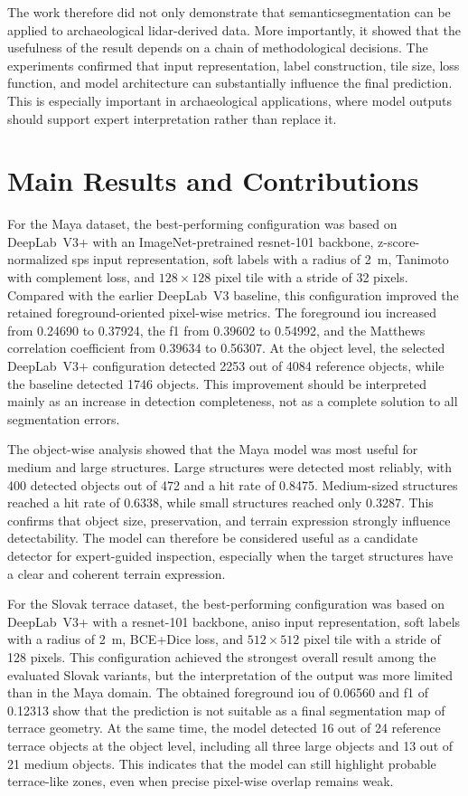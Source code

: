 The work therefore did not only demonstrate that \gls{semanticsegmentation} can be applied to archaeological \gls{lidar}-derived data. More importantly, it showed that the usefulness of the result depends on a chain of methodological decisions. The experiments confirmed that input representation, label construction, tile size, loss function, and model architecture can substantially influence the final prediction. This is especially important in archaeological applications, where model outputs should support expert interpretation rather than replace it.

\section{Main Results and Contributions}

For the Maya dataset, the best-performing configuration was based on DeepLab~V3+ with an ImageNet-pretrained \gls{resnet}-101 backbone, z-score-normalized \gls{sps} input representation, soft labels with a radius of 2~m, Tanimoto with complement loss, and $128 \times 128$ pixel tile with a stride of 32 pixels. Compared with the earlier DeepLab~V3 baseline, this configuration improved the retained foreground-oriented pixel-wise metrics. The foreground \gls{iou} increased from 0.24690 to 0.37924, the \gls{f1} from 0.39602 to 0.54992, and the Matthews correlation coefficient from 0.39634 to 0.56307. At the object level, the selected DeepLab~V3+ configuration detected 2253 out of 4084 reference objects, while the baseline detected 1746 objects. This improvement should be interpreted mainly as an increase in detection completeness, not as a complete solution to all segmentation errors.

The object-wise analysis showed that the Maya model was most useful for medium and large structures. Large structures were detected most reliably, with 400 detected objects out of 472 and a hit rate of 0.8475. Medium-sized structures reached a hit rate of 0.6338, while small structures reached only 0.3287. This confirms that object size, preservation, and terrain expression strongly influence detectability. The model can therefore be considered useful as a candidate detector for expert-guided inspection, especially when the target structures have a clear and coherent terrain expression.

For the Slovak terrace dataset, the best-performing configuration was based on DeepLab~V3+ with a \gls{resnet}-101 backbone, \gls{aniso} input representation, soft labels with a radius of 2~m, BCE+Dice loss, and $512 \times 512$ pixel tile with a stride of 128 pixels. This configuration achieved the strongest overall result among the evaluated Slovak variants, but the interpretation of the output was more limited than in the Maya domain. The obtained foreground \gls{iou} of 0.06560 and \gls{f1} of 0.12313 show that the prediction is not suitable as a final segmentation map of terrace geometry. At the same time, the model detected 16 out of 24 reference terrace objects at the object level, including all three large objects and 13 out of 21 medium objects. This indicates that the model can still highlight probable terrace-like zones, even when precise pixel-wise overlap remains weak.

